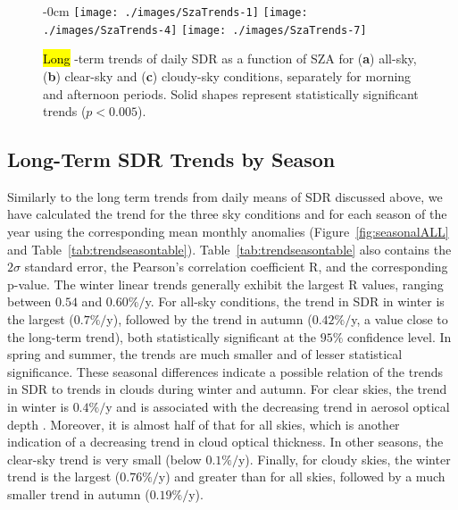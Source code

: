 \documentclass[applsci,article,accept,moreauthors,pdftex]{Definitions/mdpi}
\begin{document}
\begin{figure}[H]
    \begin{adjustwidth}{-\extralength}{0cm}
        {\centering 
                {\texttt{[image: ./images/SzaTrends-1]}}\hfill
                {\texttt{[image: ./images/SzaTrends-4]}}\hfill
                {\texttt{[image: ./images/SzaTrends-7]}}
        }

    \end{adjustwidth}
        \caption{\hl{Long}%
 -term trends of daily SDR as a function of SZA for (\textbf{a}) all-sky, (\textbf{b}) clear-sky and (\textbf{c}) cloudy-sky conditions, separately for morning and afternoon periods. Solid shapes represent statistically significant trends ($p < 0.005$).}\label{fig:szatrends}
\end{figure}



\hypertarget{long-term-sdr-trends-by-season}{%
\subsection{Long-Term SDR Trends by
Season}\label{long-term-sdr-trends-by-season}}

Similarly to the long term trends from daily means of SDR discussed
above, we have calculated the trend for the three sky conditions and for
each season of the year using the corresponding mean monthly anomalies
(Figure~\ref{fig:seasonalALL} and Table~\ref{tab:trendseasontable}).
Table~\ref{tab:trendseasontable} also contains the \(2\sigma\) standard
error, the Pearson's correlation coefficient R, and the corresponding
p-value. The winter linear trends generally exhibit the largest R values,
ranging between \(0.54\) and \(0.60\%/\)y. For all-sky conditions, the
trend in SDR in winter is the largest (\(0.7\%/\)y), followed by the
trend in autumn (\(0.42\%/\)y, a value close to the long-term trend),
both statistically significant at the \(95\%\) confidence level. In
spring and summer, the trends are much smaller and of lesser statistical
significance. These seasonal differences indicate a possible relation of
the trends in SDR to trends in clouds during winter and autumn. For
clear skies, the trend in winter is \(0.4\%/\)y and is associated with
the decreasing trend in aerosol optical depth \citep{Siomos2020}.
Moreover, it is almost half of that for all skies, which is another
indication of a decreasing trend in cloud optical thickness. In other
seasons, the clear-sky trend is very small (below \(0.1\%/\)y).
Finally, for cloudy skies, the winter trend is the largest
(\(0.76\%/\)y) and greater than for all skies, followed by a much
smaller trend in autumn (\(0.19\%/\)y).
\end{document}
